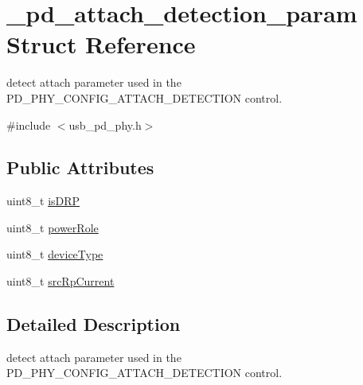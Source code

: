 \hypertarget{struct__pd__attach__detection__param}{\section{\-\_\-pd\-\_\-attach\-\_\-detection\-\_\-param Struct Reference}
\label{struct__pd__attach__detection__param}
}


detect attach parameter used in the P\-D\-\_\-\-P\-H\-Y\-\_\-\-C\-O\-N\-F\-I\-G\-\_\-\-A\-T\-T\-A\-C\-H\-\_\-\-D\-E\-T\-E\-C\-T\-I\-O\-N control.  




{\ttfamily \#include $<$usb\-\_\-pd\-\_\-phy.\-h$>$}

\subsection*{Public Attributes}
\begin{DoxyCompactItemize}
\item 
uint8\-\_\-t \hyperlink{struct__pd__attach__detection__param_aa28f1c14440b918b0e10ed04c7483095}{is\-D\-R\-P}
\item 
uint8\-\_\-t \hyperlink{struct__pd__attach__detection__param_a004647edd5c7e75ce9bd0cc218caf8b1}{power\-Role}
\item 
uint8\-\_\-t \hyperlink{struct__pd__attach__detection__param_a935484922f134dd28059b0888fbd416e}{device\-Type}
\item 
uint8\-\_\-t \hyperlink{struct__pd__attach__detection__param_a9745c17522adaa5e1e8372df1a57f233}{src\-Rp\-Current}
\end{DoxyCompactItemize}


\subsection{Detailed Description}
detect attach parameter used in the P\-D\-\_\-\-P\-H\-Y\-\_\-\-C\-O\-N\-F\-I\-G\-\_\-\-A\-T\-T\-A\-C\-H\-\_\-\-D\-E\-T\-E\-C\-T\-I\-O\-N control. 

